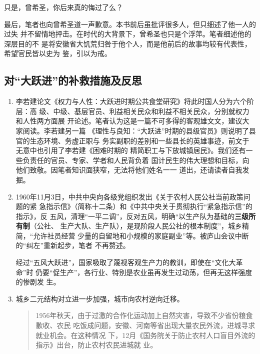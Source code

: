 {只是，曾希圣，你后来真的悔过了么？

最后，笔者也向曾希圣道一声歉意。本书前后虽批评很多人，但只细述了他一人的过失
并不留情地抨击。在时代的大背景下，曾希圣也只是个浮萍。笔者细述他的深层目的不
是将安徽省大饥荒归咎于他个人，而是他前后的故事均较有代表性，希望官民皆以史为
鉴，引以为戒。

\subsection{对“大跃进”的补救措施及反思}

\begin{enumerate}

\item 李若建论文《权力与人性：大跃进时期公共食堂研究》将此时国人分为六个阶层：高
  级、中级、基层官员、利益相关民众和利益不相关民众，分别就权力和人性两方面展
  开论述。笔者认为这是一篇不可多得的客观雄文文，建议大家阅读。李若建另一篇
  《理性与良知：“大跃进”时期的县级官员》则说明了县官的生态环境、务虚正职与
  务实副职的差别和一些县长的英雄事迹，前文于无意中也引用了李若建《困难时期的
  精简职工与下放城镇居民》。我们还有一些负责任的官员、专家、学者和人民背负着
  国计民生的伟大理想和目标，向他们致敬。因笔者知识面狭窄，无法将他们姓名一一
  道出，还请读者自我发掘。

\item 1960年11月3日，中共中央向各级党组织发出《关于农村人民公社当前政策问题的紧
  急指示信》（简称十二条）和《中共中央关于贯彻执行“紧急指示信”的指示》，反
  五风，清理“一平二调”，反对五风，明确“以生产队为基础的\textbf{三级所有制}（公社、
  生产大队、生产队），是现阶段人民公社的根本制度”，城乡精简，“允许社员经营
  少量的自留地和小规模的家庭副业”等。被庐山会议中断的“纠左”重新起步，笔者
  不再赘述。

  经过“五风大跃进”，国家吸取了蔑视客观生产力的教训，即使在“文化大革命”时
  仍要“促生产”，各行业、特别是农业虽再发生过动荡，但再无这样强度的惨剧发
  生。


\item 城乡二元结构对立进一步加强，城市向农村逆向迁移。

  \begin{quotation}
    1956年秋天，由于过激的合作化运动加上自然灾害，导致不少省份粮食歉收、农民
    吃饭成问题，安徽、河南等省出现大量农民外流，进城寻求就业机会。在这种情况
    下，12月《国务院关于防止农村人口盲目外流的指示》出台，防止农村农民进城就
    业。


\end{quotation}
\end{enumerate}}
